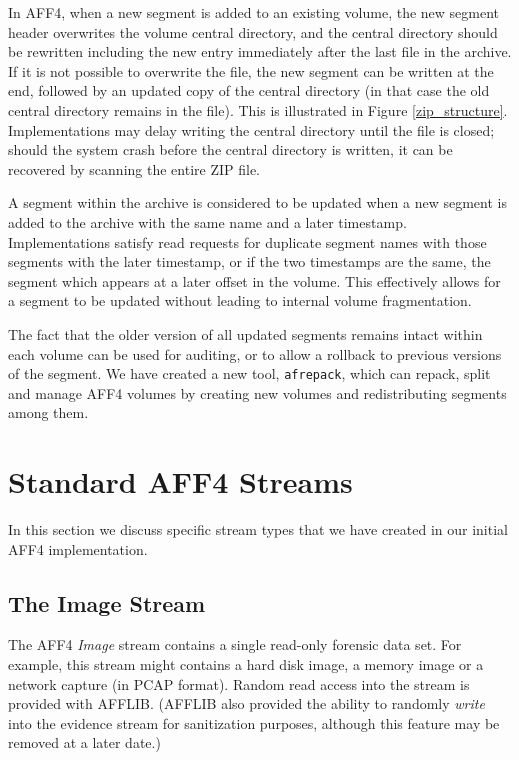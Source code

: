 \documentclass[10pt, conference]{IEEEtran}
\begin{document}
In AFF4, when a new segment is added to an existing volume, the new
segment header overwrites the volume central directory, and the
central directory should be rewritten including the new entry
immediately after the last file in the archive. If it is not possible
to overwrite the file, the new segment can be written at the end,
followed by an updated copy of the central directory (in that case the
old central directory remains in the file). This is illustrated in
Figure \ref{zip_structure}. Implementations may delay
writing the central directory until the file is closed; should the
system crash before the central directory is written, it can be
recovered by scanning the entire ZIP file.

A segment within the archive is considered to be updated when a new
segment is added to the archive with the same name and a later
timestamp. Implementations satisfy read requests for duplicate
segment names with those segments with the later timestamp, or if the
two timestamps are the same, the segment which appears at a later
offset in the volume. This effectively allows for a segment to be
updated without leading to internal volume fragmentation.

The fact that the older version of all updated segments remains intact
within each volume can be used for auditing, or to allow a rollback to
previous versions of the segment. We have created a new tool,
\texttt{afrepack}, which can repack, split and manage AFF4 volumes by
creating new volumes and redistributing segments among them.

\section{Standard AFF4 Streams}
In this section we discuss specific stream types that we have created
in our initial AFF4 implementation. 

\subsection{The Image Stream}
\label{image_stream}
The AFF4 \emph{Image} stream contains a single read-only forensic data
set. For example, this stream might contains a hard
disk image, a memory image or a network capture (in PCAP
format). Random read access into the stream is provided with
AFFLIB. (AFFLIB also provided the ability to randomly \emph{write}
into the evidence stream for sanitization purposes, although this
feature may be removed at a later date.) 
\end{document}
